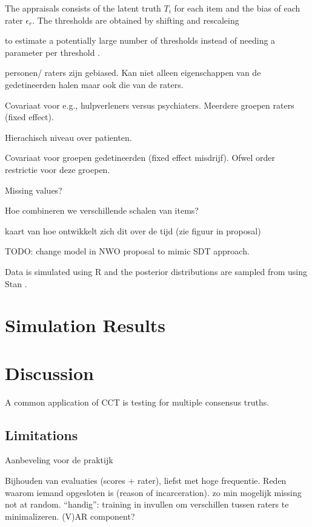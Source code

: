 \documentclass{article}
\newcommand{\Irater}{r}
\newcommand{\Iitem}{i}
\begin{document}
 

The appraisals consists of the latent truth $T_\Iitem$ for each item and the bias of each rater $\epsilon_\Irater$. The thresholds are obtained by shifting and rescaleing 


to estimate a potentially large number of thresholds instead of needing a parameter per threshold \cite{Fox1995, Gonzalez1999}.


\newpage


personen/ raters zijn gebiased. Kan niet alleen eigenschappen van de gedetineerden halen maar ook die van de raters.

Covariaat voor e.g., hulpverleners versus psychiaters. Meerdere groepen raters (fixed effect).

Hierachisch niveau over patienten.

Covariaat voor groepen gedetineerden (fixed effect misdrijf).
Ofwel order restrictie voor deze groepen.

Missing values?

Hoe combineren we verschillende schalen van items?

kaart van hoe ontwikkelt zich dit over de tijd (zie figuur in proposal)

TODO: change model in NWO proposal to mimic SDT approach.

Data is simulated using R \cite{R} and the posterior distributions are sampled from using Stan \cite{CarpenterEtAl2017Stan}.

\section*{Simulation Results}


\section*{Discussion}


A common application of CCT is testing for multiple consensus truths.

\subsection*{Limitations}

Aanbeveling voor de praktijk

Bijhouden van evaluaties (scores + rater), liefst met hoge frequentie. 
Reden waarom iemand opgesloten is (reason of incarceration).
zo min mogelijk missing not at random.
``handig'': training in invullen om verschillen tussen raters te minimalizeren.
(V)AR component?



\end{document}
